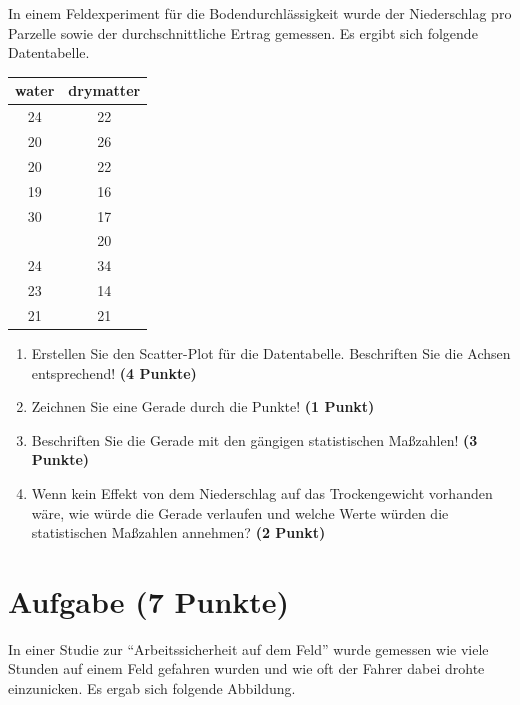 \documentclass[a4paper, 10pt]{scrartcl}\usepackage[]{graphicx}\usepackage[]{xcolor}
\begin{document}
In einem Feldexperiment f{\"u}r die Bodendurchl{\"a}ssigkeit wurde der Niederschlag
pro Parzelle sowie der durchschnittliche Ertrag gemessen. Es ergibt sich
folgende Datentabelle. 

\begin{table}[!h]
\centering
\begin{tabular}{cc}
\toprule
water & drymatter\\
\midrule
24 & 22\\
20 & 26\\
20 & 22\\
19 & 16\\
30 & 17\\
\addlinespace
28 & 20\\
24 & 34\\
23 & 14\\
21 & 21\\
\bottomrule
\end{tabular}
\end{table}



\begin{enumerate}
\item Erstellen Sie den Scatter-Plot f{\"u}r die Datentabelle. Beschriften Sie
  die Achsen entsprechend! \textbf{(4 Punkte)}
\item Zeichnen Sie eine Gerade durch die Punkte! \textbf{(1 Punkt)}
\item Beschriften Sie die Gerade mit den g{\"a}ngigen statistischen Ma{\ss}zahlen! \textbf{(3 Punkte)}
\item Wenn kein Effekt von dem Niederschlag auf das Trockengewicht
  vorhanden w{\"a}re, wie w{\"u}rde die Gerade verlaufen und welche Werte w{\"u}rden die
  statistischen Ma{\ss}zahlen annehmen? \textbf{(2 Punkt)}
\end{enumerate} 
\clearpage

\section{Aufgabe \hfill (7 Punkte)}

In einer Studie zur "`Arbeitssicherheit auf dem Feld"' wurde gemessen wie viele
Stunden auf einem Feld gefahren wurden und wie oft der Fahrer dabei drohte
einzunicken. Es ergab sich folgende Abbildung. 
\end{document}
